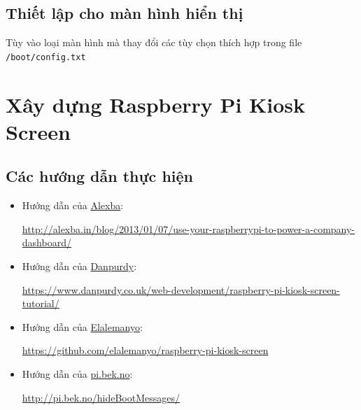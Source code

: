 \documentclass[12pt,a4paper]{article}
\begin{document}
\subsection{Thiết lập cho màn hình hiển thị}
	Tùy vào loại màn hình mà thay đổi các tùy chọn thích hợp trong file \verb|/boot/config.txt|

\section{Xây dựng Raspberry Pi Kiosk Screen}
\subsection{Các hướng dẫn thực hiện}
	\begin{itemize}
		\item Hướng dẫn của \href{http://alexba.in}{Alexba}:

			\begin{footnotesize}
				\url{http://alexba.in/blog/2013/01/07/use-your-raspberrypi-to-power-a-company-dashboard/}
			\end{footnotesize}		
		\item Hướng dẫn của \href{https://www.danpurdy.co.uk}{Danpurdy}:

			\begin{footnotesize}
				\url{https://www.danpurdy.co.uk/web-development/raspberry-pi-kiosk-screen-tutorial/}
			\end{footnotesize}
		
		\item Hướng dẫn của \href{https://github.com/elalemanyo}{Elalemanyo}:

			\begin{footnotesize}
				\url{https://github.com/elalemanyo/raspberry-pi-kiosk-screen}
			\end{footnotesize}
		
		\item Hướng dẫn của \href{http://pi.bek.no}{pi.bek.no}:

			\begin{footnotesize}
				\url{http://pi.bek.no/hideBootMessages/}
			\end{footnotesize}
	\end{itemize}
	
\end{document}
